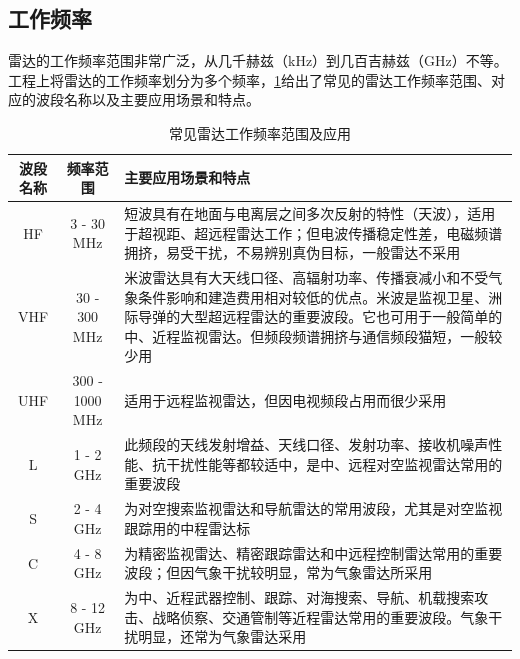\subsection{工作频率}

雷达的工作频率范围非常广泛，从几千赫兹（kHz）到几百吉赫兹（GHz）不等。工程上将雷达的工作频率划分为多个频率，\cref{tab_chp1_radar_frequency}给出了常见的雷达工作频率范围、对应的波段名称以及主要应用场景和特点。

\begin{table}[htb!]
    \centering
    \caption{常见雷达工作频率范围及应用}
    \label{tab_chp1_radar_frequency}
    \small
    \begin{tabular}{c|c|p{7cm}}
        \hline
        波段名称 & 频率范围           & 主要应用场景和特点                                                                                                      \\
        \hline
        \hline
        HF   & 3 - 30 MHz     & 短波具有在地面与电离层之间多次反射的特性（天波），适用于超视距、超远程雷达工作；但电波传播稳定性差，电磁频谱拥挤，易受干扰，不易辨别真伪目标，一般雷达不采用
        \\
        \hline
        VHF  & 30 - 300 MHz   & 米波雷达具有大天线口径、高辐射功率、传播衰减小和不受气象条件影响和建造费用相对较低的优点。米波是监视卫星、洲际导弹的大型超远程雷达的重要波段。它也可用于一般简单的中、近程监视雷达。但频段频谱拥挤与通信频段猫短，一般较少用 \\ \hline
        UHF  & 300 - 1000 MHz & 适用于远程监视雷达，但因电视频段占用而很少采用                                                                                        \\
        \hline
        L    & 1 - 2 GHz      & 此频段的天线发射增益、天线口径、发射功率、接收机噪声性能、抗干扰性能等都较适中，是中、远程对空监视雷达常用的重要波段                                                     \\
        \hline
        S    & 2 - 4 GHz      & 为对空搜索监视雷达和导航雷达的常用波段，尤其是对空监视跟踪用的中程雷达标                                                                           \\
        \hline
        C    & 4 - 8 GHz      & 为精密监视雷达、精密跟踪雷达和中远程控制雷达常用的重要波段；但因气象干扰较明显，常为气象雷达所采用                                                              \\
        \hline
        X    & 8 - 12 GHz     & 为中、近程武器控制、跟踪、对海搜索、导航、机载搜索攻击、战略侦察、交通管制等近程雷达常用的重要波段。气象干扰明显，还常为气象雷达采用                                             \\

\end{tabular}
\end{table}
